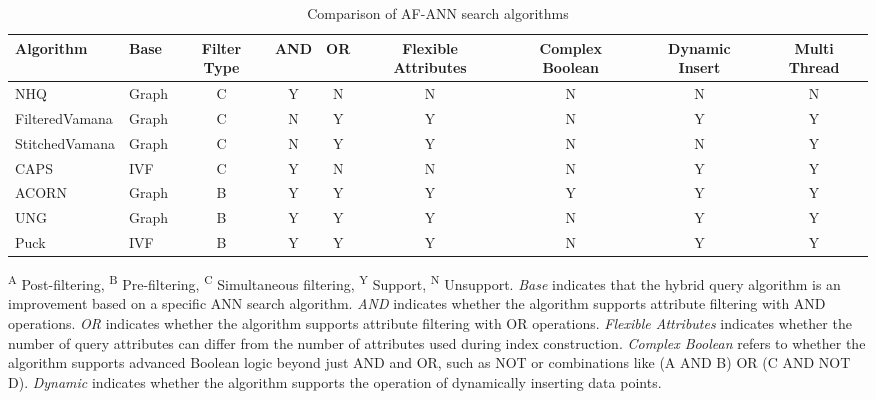 \documentclass[sigconf, nonacm]{acmart}
\begin{document}
\setlength{\textfloatsep}{0cm}
\setlength{\floatsep}{0cm}
\begin{table}[t]
	\centering
      \setlength{\abovecaptionskip}{0.1cm}
     \setlength{\belowcaptionskip}{-0.2cm}
	\caption{Comparison of AF-ANN search algorithms}
	\small
	\label{tab:compair_1}
    \begin{tabular}{|l|l|c|c|c|c|c|c|c|}
		\hline
        \textbf{Algorithm} & \textbf{Base} & \textbf{Filter Type} & \textbf{AND} & \textbf{OR} & \textbf{Flexible Attributes} & \textbf{Complex Boolean} & \textbf{Dynamic Insert} & \textbf{Multi Thread} \\
		\hline
         NHQ & Graph & C & Y & N& N& N & N & N \\
         FilteredVamana & Graph & C & N & Y & Y & N & Y & Y \\
	StitchedVamana & Graph & C & N & Y & Y & N & N & Y  \\
        CAPS & IVF & C & Y & N & N & N & Y & Y \\
        ACORN & Graph & B & Y & Y & Y & Y & Y & Y \\
       UNG & Graph & B & Y & Y & Y & N & Y & Y \\ 
        Puck & IVF & B & Y & Y & Y & N & Y & Y \\
		
		\hline

	\end{tabular}

  
	\centering
    \footnotesize{
	\begin{minipage}{\linewidth}
		\vspace{0.1cm}
		\textsuperscript{A} Post-filtering, 
		\textsuperscript{B} Pre-filtering, 
		\textsuperscript{C} Simultaneous filtering, 
		\textsuperscript{Y} Support, 
		\textsuperscript{N} Unsupport. 
		\textit{Base} indicates that the hybrid query algorithm is an improvement based on a specific ANN search algorithm. 
		\textit{AND} indicates whether the algorithm supports attribute filtering with AND operations. 
		\textit{OR} indicates whether the algorithm supports attribute filtering with OR operations. 
		\textit{Flexible Attributes} indicates whether the number of query attributes can differ from the number of attributes used during index construction. 
		\textit{Complex Boolean} refers to whether the algorithm supports advanced Boolean logic beyond just AND and OR, such as NOT or combinations like (A AND B) OR (C AND NOT D). 
		\textit{Dynamic} indicates whether the algorithm supports the operation of dynamically inserting data points.
	\end{minipage}}
  \vspace{-0.3cm}
\end{table}
\end{document}
